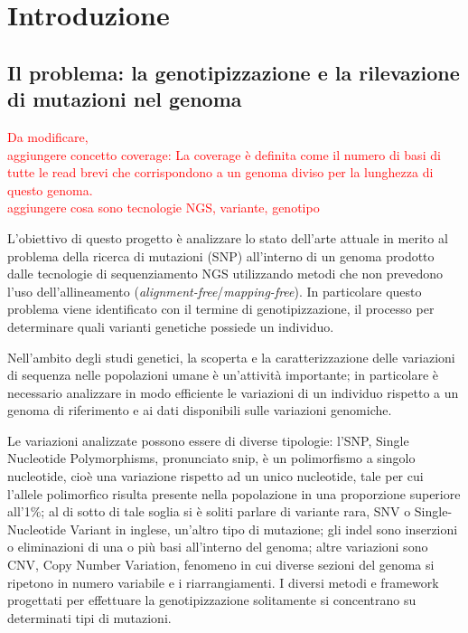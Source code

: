 \documentclass[../main.tex]{subfiles}
\begin{document}
\section{Introduzione} 

\subsection{Il problema: la genotipizzazione e la rilevazione di mutazioni nel genoma}

\textcolor{red}{Da modificare, 
\\aggiungere concetto coverage: La coverage è definita come il numero di basi di tutte le read brevi che corrispondono a un genoma diviso per la lunghezza di questo genoma.\\
aggiungere cosa sono tecnologie NGS, variante, genotipo} 

L'obiettivo di questo progetto è analizzare lo stato dell'arte attuale in merito al problema della ricerca di mutazioni (SNP) all'interno di un genoma prodotto dalle tecnologie di sequenziamento NGS utilizzando metodi che non prevedono l'uso dell'allineamento (\textit{alignment-free}/\textit{mapping-free}). In particolare questo problema viene identificato con il termine di genotipizzazione, il processo per determinare quali varianti genetiche possiede un individuo.

Nell'ambito degli studi genetici, la scoperta e la caratterizzazione delle variazioni di sequenza nelle popolazioni umane è un'attività importante; in particolare è necessario analizzare in modo efficiente le variazioni di un individuo rispetto a un genoma di riferimento e ai dati disponibili sulle variazioni genomiche. 

Le variazioni analizzate possono essere di diverse tipologie: l'SNP, Single Nucleotide Polymorphisms, pronunciato snip, è un polimorfismo a singolo nucleotide, cioè una variazione rispetto ad un unico nucleotide, tale per cui l'allele polimorfico risulta presente nella popolazione in una proporzione superiore all'1\%; al di sotto di tale soglia si è soliti parlare di variante rara, SNV o Single-Nucleotide Variant in inglese, un'altro tipo di mutazione; gli indel sono inserzioni o eliminazioni di una o più basi all'interno del genoma; altre variazioni sono CNV, Copy Number Variation, fenomeno in cui diverse sezioni del genoma si ripetono in numero variabile e i riarrangiamenti. I diversi metodi e framework progettati per effettuare la genotipizzazione solitamente si concentrano su determinati tipi di mutazioni.
\end{document}
